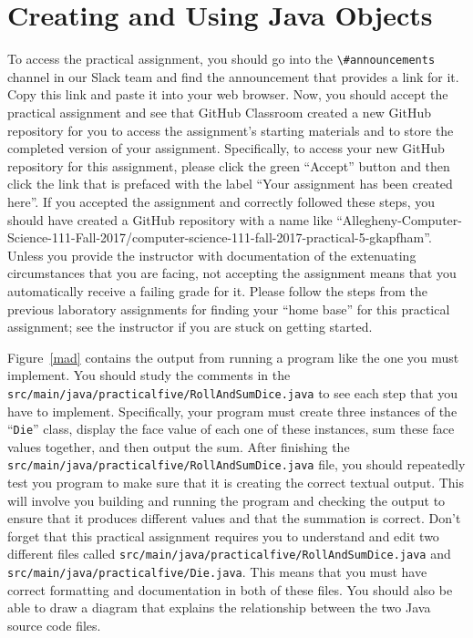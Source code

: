 \documentclass[11pt]{article}
\newcommand{\mainprogramsource}{\lstinline{src/main/java/practicalfive/RollAndSumDice.java}}
\newcommand{\secondprogramsource}{\lstinline{src/main/java/practicalfive/Die.java}}
\newcommand{\command}[1]{``\lstinline{#1}''}
\newcommand{\channel}[1]{\lstinline{#1}}
\begin{document}
\section*{Creating and Using Java Objects}

To access the practical assignment, you should go into the \channel{\#announcements} channel in our Slack team and find
the announcement that provides a link for it. Copy this link and paste it into your web browser. Now, you should accept
the practical assignment and see that GitHub Classroom created a new GitHub repository for you to access the
assignment's starting materials and to store the completed version of your assignment. Specifically, to access your new
GitHub repository for this assignment, please click the green ``Accept'' button and then click the link that is prefaced
with the label ``Your assignment has been created here''. If you accepted the assignment and correctly followed these
steps, you should have created a GitHub repository with a name like
``Allegheny-Computer-Science-111-Fall-2017/computer-science-111-fall-2017-practical-5-gkapfham''. Unless you provide the
instructor with documentation of the extenuating circumstances that you are facing, not accepting the assignment means
that you automatically receive a failing grade for it. Please follow the steps from the previous laboratory assignments
for finding your ``home base'' for this practical assignment; see the instructor if you are stuck on getting started.

Figure~\ref{mad} contains the output from running a program like the one you must implement. You should study the
comments in the \mainprogramsource{} to see each step that you have to implement. Specifically, your program must create
three instances of the \command{Die} class, display the face value of each one of these instances, sum these face values
together, and then output the sum. After finishing the \mainprogramsource{} file, you should repeatedly test you program
to make sure that it is creating the correct textual output. This will involve you building and running the program and
checking the output to ensure that it produces different values and that the summation is correct. Don't forget that
this practical assignment requires you to understand and edit two different files called \mainprogramsource{} and
\secondprogramsource{}. This means that you must have correct formatting and documentation in both of these files. You
should also be able to draw a diagram that explains the relationship between the two Java source code files.
\end{document}

